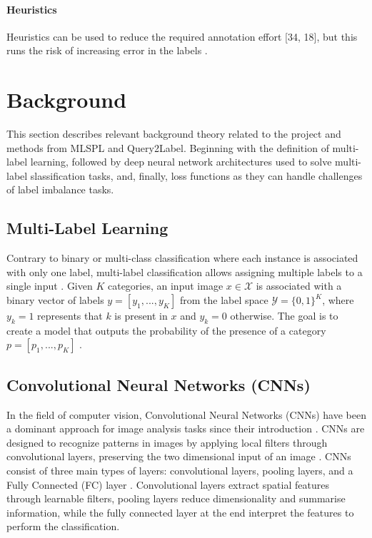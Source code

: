 \documentclass[lettersize,journal]{IEEEtran}
\begin{document}
\paragraph{Heuristics}
Heuristics can be used to reduce the required
annotation effort [34, 18], but this runs the risk of increasing
error in the labels \cite{mlsp}.

\section{Background}
This section describes relevant background theory related to the project and methods from MLSPL and Query2Label. Beginning with the definition of multi-label learning, followed by deep neural network architectures used to solve multi-label slassification tasks, and, finally, loss functions as they can handle challenges of label imbalance tasks.

\subsection{Multi-Label Learning}
Contrary to binary or multi-class classification where each instance is associated with only one label, multi-label classification allows assigning multiple labels to a single input \cite{mlsp}. Given $K$ categories, an input image $x\in \mathcal{X}$ is associated with a binary vector of labels $y=[y_1,...,y_K]$ from the label space $\mathcal{Y}=\{0,1\}^K$, where $y_k=1$ represents that $k$ is present in $x$ and $y_k=0$ otherwise. The goal is to create a model that outputs the probability of the presence of a category $p=[p_1,...,p_K]$ \cite{mlsp,Query2Label}.

\subsection{Convolutional Neural Networks (CNNs)}
In the field of computer vision, Convolutional Neural Networks (CNNs) have been a dominant approach for image analysis tasks since their introduction \cite{lecun95}. CNNs are designed to recognize patterns in images by applying local filters through convolutional layers, preserving the two dimensional input of an image \cite{zhang2023dive}. CNNs consist of three main types of layers: convolutional layers, pooling layers, and a Fully Connected (FC) layer \cite{asawaCS231n}. Convolutional layers extract spatial features through learnable filters, pooling layers reduce dimensionality and summarise information, while the fully connected layer at the end interpret the features to perform the classification.
\end{document}
